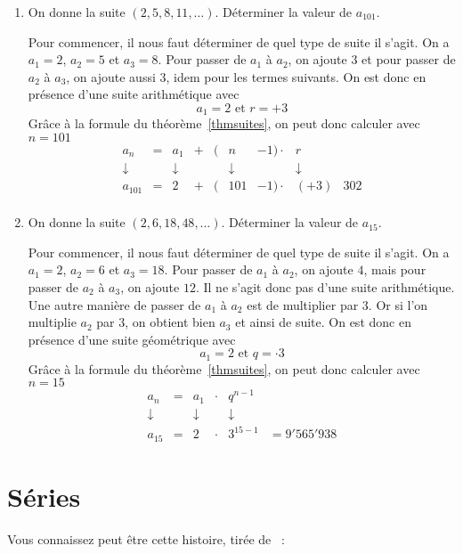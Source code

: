\begin{exemple}
\begin{enumerate}
\item On donne la suite $(2,5,8,11,\dots)$. Déterminer la valeur de $a_{101}$.

Pour commencer, il nous faut déterminer de quel type de suite il s'agit. On a $a_1 = 2$, $a_2 = 5$ et $a_3 = 8$. Pour passer de $a_1$ à $a_2$, on ajoute $3$ et pour passer de $a_2$ à $a_3$, on ajoute aussi $3$, idem pour les termes suivants. On est donc en présence d'une suite arithmétique avec 
$$
a_1 = 2 \mbox{ et } r = +3
$$
Grâce à la formule du théorème~\ref{thmsuites}, on peut donc calculer avec $n=101$
$$
\begin{array}{ccccccccl}
a_n &=& a_1 &+& (&n&-1) \cdot &r &\\
\downarrow & & \downarrow & & & \downarrow& & \downarrow &\\
a_{101} &=& 2 &+&(&101&-1) \cdot & (+3) & 302\\
\end{array}
$$
\item On donne la suite $(2,6,18,48,\dots)$. Déterminer la valeur de $a_{15}$.

Pour commencer, il nous faut déterminer de quel type de suite il s'agit. On a $a_1 = 2$, $a_2 = 6$ et $a_3 = 18$. Pour passer de $a_1$ à $a_2$, on ajoute $4$, mais pour passer de $a_2$ à $a_3$, on ajoute $12$. Il ne s'agit donc pas d'une suite arithmétique. Une autre manière de passer de $a_1$ à $a_2$ est de multiplier par $3$. Or si l'on multiplie $a_2$ par $3$, on obtient bien $a_3$ et ainsi de suite. On est donc en présence d'une suite géométrique avec
$$
a_1 = 2 \mbox{ et } q = \cdot 3
$$
Grâce à la formule du théorème~\ref{thmsuites}, on peut donc calculer avec $n=15$
$$
\begin{array}{cccccl}
a_n & = & a_1 & \cdot & q^{n-1}& \\
\downarrow &  & \downarrow & & \downarrow &\\
a_{15} &=& 2 & \cdot & 3^{15-1} &= 9'565'938
\end{array}
$$
\end{enumerate}
\end{exemple}

\section{Séries}

Vous connaissez peut être cette histoire, tirée de~\cite{echec} :

